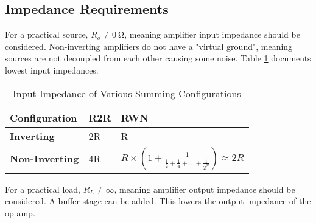 \subsection{Impedance Requirements}{\label{dac_impedance}}

For a practical source, $R_o \neq \SI{0}{\ohm}$, meaning amplifier input impedance should be considered. Non-inverting amplifiers do not have a "virtual ground",
meaning sources are not decoupled from each other \cite{SummingAmplifierBasics} causing some noise. Table \ref{tab:dac_amplifier_impedance} documents lowest input impedances:

\begin{table}[!h]
  \centering
  \renewcommand{\arraystretch}{1.2}
  \begin{tabular}{ |p{3cm}|p{6cm}|p{6cm}| }
    \hline
    \textbf{Configuration}         & \textbf{R2R}                               & \textbf{RWN}                      \\
    \hline
    \textbf{Inverting}             & 2R                                         & R                                 \\
    \hline
    \textbf{Non-Inverting}         & 4R                                         & $R \times \left(1 + \frac{1}{\frac{1}{2} + \frac{1}{4} + ... + \frac{1}{2^N}}\right) \approx 2R$                              \\
    \hline
  \end{tabular}
  \caption{Input Impedance of Various Summing Configurations}
  {\label{tab:dac_amplifier_impedance}}
\end{table}

\noindent For a practical load, $R_L \neq \infty$, meaning amplifier output impedance should be considered.
A buffer stage can be added. This lowers the output impedance of the op-amp.